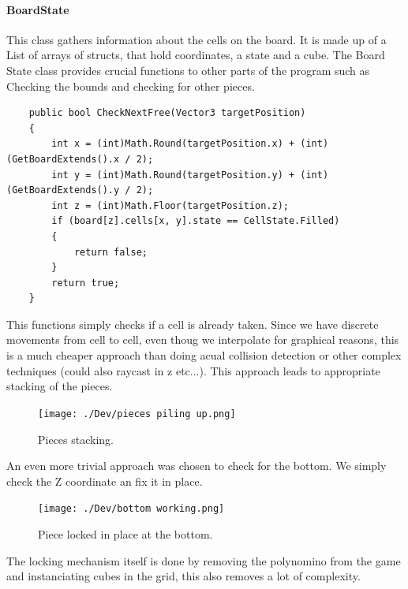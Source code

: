 \documentclass{article}
\begin{document}
\paragraph{BoardState}
This class gathers information about the cells on the board. It is made up of a List of arrays of structs, that hold coordinates, a state and a cube. The Board State class provides crucial functions to other parts of the program such as Checking the bounds and checking for other pieces.
\begin{verbatim}
    public bool CheckNextFree(Vector3 targetPosition)
    {
        int x = (int)Math.Round(targetPosition.x) + (int)(GetBoardExtends().x / 2);
        int y = (int)Math.Round(targetPosition.y) + (int)(GetBoardExtends().y / 2);
        int z = (int)Math.Floor(targetPosition.z);
        if (board[z].cells[x, y].state == CellState.Filled)
        {
            return false;
        }
        return true;
    }
\end{verbatim}
This functions simply checks if a cell is already taken. Since we have discrete movements from cell to cell, even thoug we interpolate for graphical reasons, this is a much cheaper approach than doing acual collision detection or other complex techniques (could also raycast in z etc...).
This approach leads to appropriate stacking of the pieces.
\begin{figure}
    \centering
    \texttt{[image: ./Dev/pieces piling up.png]}
    \caption{Pieces stacking.}
    \label{fig:board}
\end{figure}
An even more trivial approach was chosen to check for the bottom. We simply check the Z coordinate an fix it in place.
\begin{figure}
    \label{fig:bottom}
    \centering
    \texttt{[image: ./Dev/bottom working.png]}
    \caption{Piece locked in place at the bottom.}
\end{figure}
The locking mechanism itself is done by removing the polynomino from the game and instanciating cubes in the grid, this also removes a lot of complexity.
\end{document}

